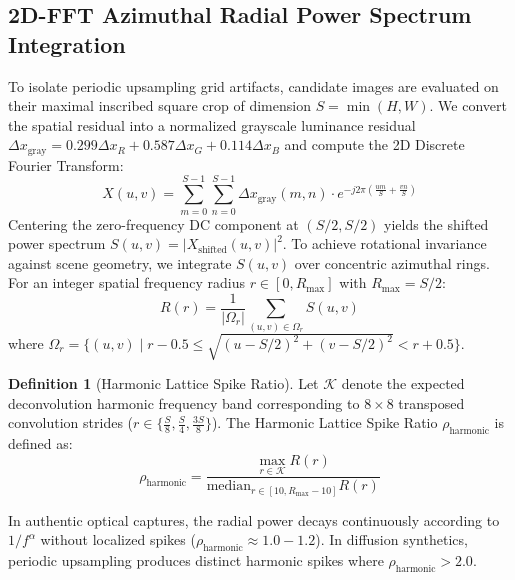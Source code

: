 \documentclass[11pt]{article}
\theoremstyle{definition}
\newtheorem{definition}{Definition}
\begin{document}
\subsection{2D-FFT Azimuthal Radial Power Spectrum Integration}
To isolate periodic upsampling grid artifacts, candidate images are evaluated on their maximal inscribed square crop of dimension $S = \min(H, W)$. We convert the spatial residual into a normalized grayscale luminance residual $\Delta x_{\text{gray}} = 0.299 \Delta x_R + 0.587 \Delta x_G + 0.114 \Delta x_B$ and compute the 2D Discrete Fourier Transform:
\begin{equation}
X(u, v) = \sum_{m=0}^{S-1} \sum_{n=0}^{S-1} \Delta x_{\text{gray}}(m, n) \cdot e^{-j 2\pi \left( \frac{u m}{S} + \frac{v n}{S} \right)}
\end{equation}
Centering the zero-frequency DC component at $(S/2, S/2)$ yields the shifted power spectrum $S(u, v) = |X_{\text{shifted}}(u, v)|^2$. To achieve rotational invariance against scene geometry, we integrate $S(u, v)$ over concentric azimuthal rings. For an integer spatial frequency radius $r \in [0, R_{\max}]$ with $R_{\max} = S/2$:
\begin{equation}
R(r) = \frac{1}{|\Omega_r|} \sum_{(u, v) \in \Omega_r} S(u, v)
\end{equation}
where $\Omega_r = \{ (u, v) \mid r - 0.5 \le \sqrt{(u - S/2)^2 + (v - S/2)^2} < r + 0.5 \}$.

\begin{definition}[Harmonic Lattice Spike Ratio]
Let $\mathcal{K}$ denote the expected deconvolution harmonic frequency band corresponding to $8\times 8$ transposed convolution strides ($r \in \{ \frac{S}{8}, \frac{S}{4}, \frac{3S}{8} \}$). The Harmonic Lattice Spike Ratio $\rho_{\text{harmonic}}$ is defined as:
\begin{equation}
\rho_{\text{harmonic}} = \frac{\max_{r \in \mathcal{K}} R(r)}{\text{median}_{r \in [10, R_{\max}-10]} R(r)}
\end{equation}
\end{definition}

In authentic optical captures, the radial power decays continuously according to $1/f^\alpha$ without localized spikes ($\rho_{\text{harmonic}} \approx 1.0 - 1.2$). In diffusion synthetics, periodic upsampling produces distinct harmonic spikes where $\rho_{\text{harmonic}} > 2.0$.
\end{document}
